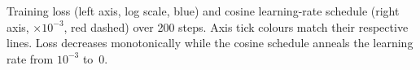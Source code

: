 \caption{Training loss (left axis, log scale, blue) and cosine learning-rate schedule (right axis, ×$10^{-3}$, red dashed) over 200 steps. Axis tick colours match their respective lines. Loss decreases monotonically while the cosine schedule anneals the learning rate from $10^{-3}$ to~0.}
